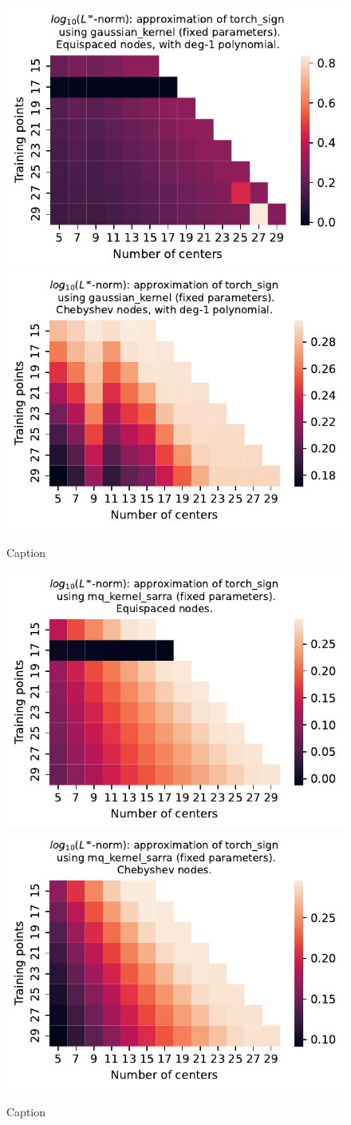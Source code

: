 \documentclass[12pt]{report} %
\begin{document}
\begin{figure}[ht]
  \centering

  \includegraphics[width=.49\textwidth]{imagenes/experiments/1d/least_squares/opt-torch_sign-Kgaussian_kernel-Poly-Equi.pdf}
  \includegraphics[width=.49\textwidth]{imagenes/experiments/1d/least_squares/opt-torch_sign-Kgaussian_kernel-Poly-Cheb.pdf}
  \caption{Caption}
  \label{fig:opt-torch-sign-gaussian-poly}
\end{figure}


\begin{figure}[ht]
  \centering

  \includegraphics[width=.49\textwidth]{imagenes/experiments/1d/least_squares/opt-torch_sign-Kmq_kernel_sarra-Equi.pdf}
  \includegraphics[width=.49\textwidth]{imagenes/experiments/1d/least_squares/opt-torch_sign-Kmq_kernel_sarra-Cheb.pdf}
  \caption{Caption}
  \label{fig:opt-torch-sign-sarra}
\end{figure}
\end{document}

